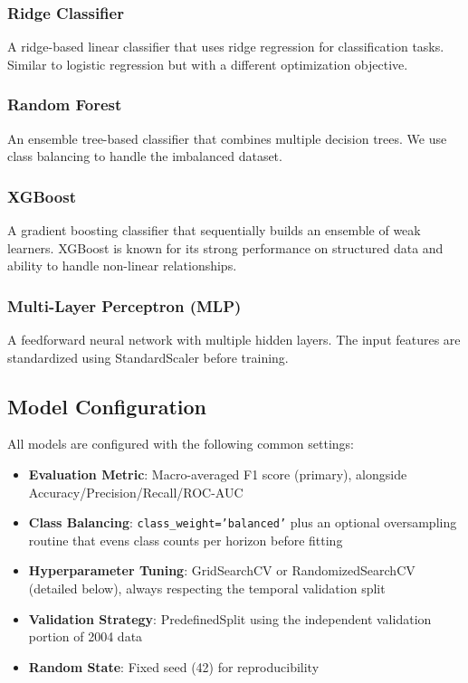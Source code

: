 \documentclass[12pt,a4paper]{article}
\begin{document}
\subsubsection{Ridge Classifier}
A ridge-based linear classifier that uses ridge regression for classification tasks. Similar to logistic regression but with a different optimization objective.

\subsubsection{Random Forest}
An ensemble tree-based classifier that combines multiple decision trees. We use class balancing to handle the imbalanced dataset.

\subsubsection{XGBoost}
A gradient boosting classifier that sequentially builds an ensemble of weak learners. XGBoost is known for its strong performance on structured data and ability to handle non-linear relationships.

\subsubsection{Multi-Layer Perceptron (MLP)}
A feedforward neural network with multiple hidden layers. The input features are standardized using StandardScaler before training.

\subsection{Model Configuration}

All models are configured with the following common settings:
\begin{itemize}
    \item \textbf{Evaluation Metric}: Macro-averaged F1 score (primary), alongside Accuracy/Precision/Recall/ROC-AUC
    \item \textbf{Class Balancing}: \texttt{class\_weight='balanced'} plus an optional oversampling routine that evens class counts per horizon before fitting
    \item \textbf{Hyperparameter Tuning}: GridSearchCV or RandomizedSearchCV (detailed below), always respecting the temporal validation split
    \item \textbf{Validation Strategy}: PredefinedSplit using the independent validation portion of 2004 data
    \item \textbf{Random State}: Fixed seed (42) for reproducibility
\end{itemize}
\end{document}
